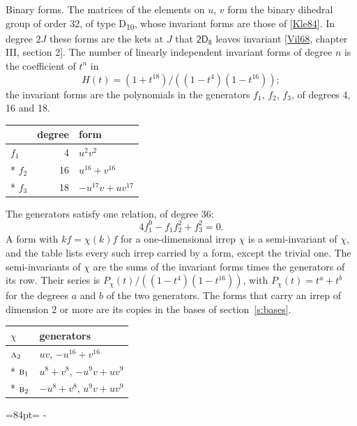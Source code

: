 \documentclass[10pt,a4paper]{article}
\makeatletter
\renewcommand\paragraph{\@startsection{paragraph}{4}{\z@}{1.5ex plus .5ex minus .2ex}{-1em}%
  {\normalfont\small\sffamily\bfseries\color{parttitle}}}
\newcommand{\needspace}[1]{\par\penalty-100\begingroup\dimen0=#1\relax\dimen2=\pagegoal
  \advance\dimen2-\pagetotal\ifdim\dimen0>\dimen2\relax\ifdim\dimen2>0pt\vfil\break\fi\fi
  \endgroup}
\numberwithin{equation}{section}
\newcommand{\grp}[1]{\mathsf{#1}}
\newcommand{\irr}[1]{\text{\normalfont\scshape #1}}
\makeatother
\begin{document}
\paragraph{Binary forms.}
The matrices of the elements on $u$, $v$ form the binary dihedral group of order 32, of type D\textsubscript{10}, whose invariant forms are those of [\href{../../../REFERENCES.pdf\#ref.Kle84}{Kle84}]. In degree $2J$ these forms are the kets at $J$ that $\grp{2D_{8}}$ leaves invariant [\href{../../../REFERENCES.pdf\#ref.Vil68}{Vil68}, chapter III, section 2]. \label{n:head.degree}\label{n:head.form}The number of linearly independent invariant forms of degree $n$ is the coefficient of $t^n$ in
\begin{equation}\label{e:molien}H(t) = (1 + t^{18})/((1-t^{4})(1-t^{16}));\end{equation}
the invariant forms are the polynomials in the generators $f_1$, $f_2$, $f_3$, of degrees 4, 16 and 18.
{\small\begin{longtable}{@{}lrl@{}}\toprule
& degree & form\\\midrule\endhead
\bottomrule\endfoot\endlastfoot
$f_{1}$ & 4 & $u^{2}v^{2}$\\*
$f_{2}$ & 16 & $u^{16} + v^{16}$\\*
$f_{3}$ & 18 & $-u^{17}v + uv^{17}$\\
\bottomrule\end{longtable}}
The generators satisfy one relation, of degree 36:
\begin{equation}\label{e:relation}4f_{1}^{9} - f_{1}f_{2}^{2} + f_{3}^{2} = 0.\end{equation}
A form with $k f = \chi(k) f$ for a one-dimensional irrep $\chi$ is a semi-invariant of $\chi$, and the table lists every such irrep carried by a form, except the trivial one. \label{n:head.generators}The semi-invariants of $\chi$ are the sums of the invariant forms times the generators of its row. Their series is $P_\chi(t)/((1-t^{4})(1-t^{16}))$, with $P_\chi(t) = t^{a} + t^{b}$ for the degrees $a$ and $b$ of the two generators. The forms that carry an irrep of dimension 2 or more are its copies in the bases of section~\ref{s:bases}.
{\small\begin{longtable}{@{}ll@{}}\toprule
$\chi$ & generators\\\midrule\endhead
\bottomrule\endfoot\endlastfoot
$\irr{a}_{2}$ & $uv$, $-u^{16} + v^{16}$\\*
$\irr{b}_{1}$ & $u^{8} + v^{8}$, $-u^{9}v + uv^{9}$\\*
$\irr{b}_{2}$ & $-u^{8} + v^{8}$, $u^{9}v + uv^{9}$\\
\bottomrule\end{longtable}}
\needspace{84pt}
\end{document}
